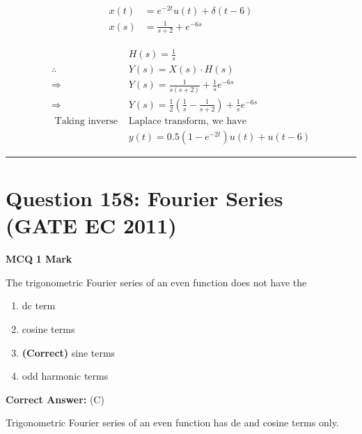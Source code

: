 \documentclass[11pt,a4paper]{article}
\begin{document}
\begin{tcolorbox}[solbox, title=Detailed Solution -- Question 157]
\[
\begin{aligned} x(t)&=e^{-2 t} u(t)+\delta(t-6) \\ x(s)&=\frac{1}{s+2}+e^{-6 s} \end{aligned}
\]

 
\[
\begin{aligned} & H(s)=\frac{1}{s} \\ \therefore \quad & Y(s)=X(s) \cdot H(s) \\ \Rightarrow \quad & Y(s)=\frac{1}{s(s+2)}+\frac{1}{s} e^{-6 s} \\ \Rightarrow \quad & Y(s)=\frac{1}{2}\left(\frac{1}{s}-\frac{1}{s+2}\right)+\frac{1}{s} e^{-6 s} \\ \text { Taking inverse }&\text{Laplace transform, we have } \\ & y(t)=0.5\left(1-e^{-2 t}\right) u(t)+u(t-6) \end{aligned}
\]
\end{tcolorbox}

\vspace{1.5em}
\hrule
\vspace{1.5em}

\section*{Question 158: Fourier Series (GATE EC 2011)}
\noindent \textbf{\color{primary}MCQ} \hfill \textbf{\color{secondary}1 Mark}


\noindent The trigonometric Fourier series of an even function does not have the


\begin{enumerate}[label=(\Alph*)]
    \item dc term
    \item cosine terms
    \item \textbf{(Correct)} sine terms
    \item odd harmonic terms
\end{enumerate}

\noindent \textbf{Correct Answer:} (C)

\begin{tcolorbox}[solbox, title=Detailed Solution -- Question 158]
Trigonometric Fourier series of an even function
has de and cosine terms only.
\end{tcolorbox}
\end{document}
